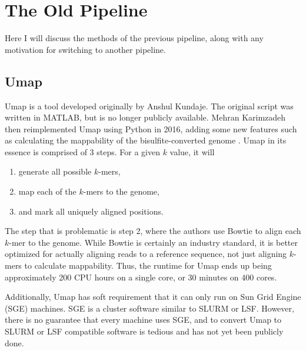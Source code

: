 \documentclass[a4paper]{article}
\begin{document}
  \section{The Old Pipeline}
  Here I will discuss the methods of the previous pipeline, along with any motivation for switching to another pipeline.

    \subsection{Umap}
    Umap is a tool developed originally by Anshul Kundaje. The original script was written in MATLAB, but is no longer
    publicly available. Mehran Karimzadeh then reimplemented Umap using Python in 2016, adding some new features such as
    calculating the mappability of the bisulfite-converted genome \cite{karimzadeh_umap_2018}. Umap in its essence is
    comprised of 3 steps. For a given $k$ value, it will
    \begin{enumerate}
      \item generate all possible $k$-mers,
      \item map each of the $k$-mers to the genome,
      \item and mark all uniquely aligned positions.
    \end{enumerate}
    The step that is problematic is step 2, where the authors use Bowtie \cite{langmead_ultrafast_2009} to align each $k$-mer to the genome.
    While Bowtie is certainly an industry standard, it is better optimized for actually aligning reads to a reference
    sequence, not just aligning $k$-mers to calculate mappability. Thus, the runtime for Umap ends up being approximately
    200 CPU hours on a single core, or 30 minutes on 400 cores.

    Additionally, Umap has soft requirement that it can only run on Sun Grid Engine (SGE) machines. SGE is a cluster
    software similar to SLURM or LSF. However, there is no guarantee that every machine uses SGE, and to convert Umap to
    SLURM or LSF compatible software is tedious and has not yet been publicly done.
\end{document}
